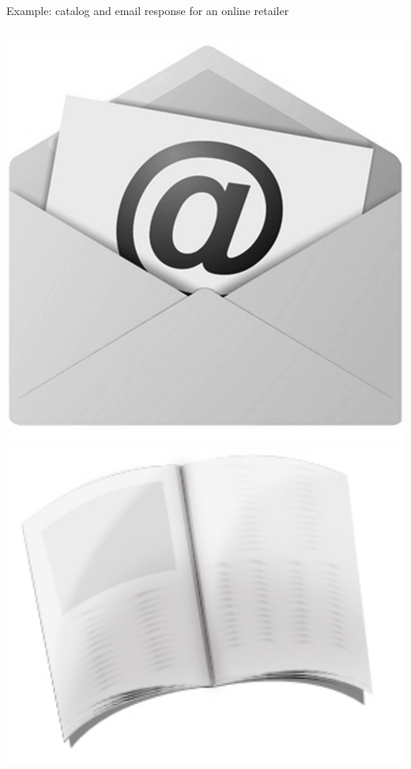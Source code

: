 \documentclass[10pt, aspectratio=169]{beamer}
\begin{document}
\begin{frame}{Example: catalog and email response for an online retailer}
\begin{columns}
\begin{center}
\includegraphics[width=\textwidth]{images/Subscribe.jpeg} \\
\bigskip
\includegraphics[width=1.2\textwidth]{images/Catalog_Icon.jpg}

\end{center}
\end{columns}
\end{frame}
\end{document}
